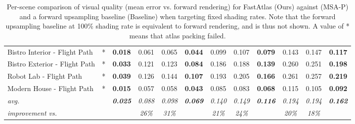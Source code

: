 \begin{table*}[t]
\begin{tabular}{l cc | ccc | ccc | ccc}
Bistro Interior - Flight Path & *              & \textbf{0.018}          & 0.061             & 0.065          & \textbf{0.044}          & 0.099             & 0.107          & \textbf{0.079}          & 0.143             & 0.147          & \textbf{0.117}          \\
Bistro Exterior - Flight Path & *              & \textbf{0.033}          & 0.121             & 0.123          & \textbf{0.084}          & 0.186             & 0.188          & \textbf{0.139}          & 0.260             & 0.251          & \textbf{0.198}          \\
Robot Lab - Flight Path       & *              & \textbf{0.039}          & 0.126             & 0.144          & \textbf{0.107}          & 0.193             & 0.205          & \textbf{0.166}          & 0.261             & 0.257          & \textbf{0.219}          \\
Modern House - Flight Path    & *              & \textbf{0.015}          & 0.057             & 0.058          & \textbf{0.043}          & 0.085             & 0.083          & \textbf{0.068}          & 0.115             & 0.105          & \textbf{0.092}          \\
\hline
\textit{avg.}                 &                & \textit{\textbf{0.025}} & \textit{0.088}    & \textit{0.098} & \textit{\textbf{0.069}} & \textit{0.140}    & \textit{0.149} & \textit{\textbf{0.116}} & \textit{0.194}    & \textit{0.194} & \textit{\textbf{0.162}} \\
\textit{improvement vs.}      &                &                         & \textit{26\%}     & \textit{31\%}  &                         & \textit{21\%}     & \textit{24\%}  &                         & \textit{20\%}     & \textit{18\%}  &                        
\end{tabular}
\vspace{1mm}
\caption{Per-scene comparison of visual quality (mean \FLIP error vs. forward rendering) for FastAtlas (Ours) against \cite{Neff2022MSA} (MSA-P) and a forward upsampling baseline (Baseline) when targeting fixed shading rates. Note that the forward upsampling baseline at 100\% shading rate is equivalent to forward rendering, and is thus not shown. A value of * means that atlas packing failed.}
\label{tab:supp_flip_fixed_sr}
\vspace{-3mm}
\end{table*}
